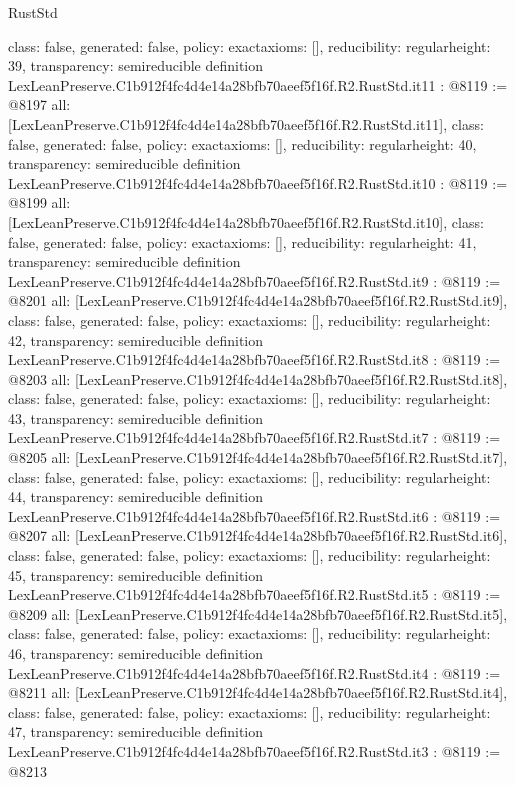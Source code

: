 \begin{lexlean}{RustStd}
\begin{coremodule}
{  class: false,
  generated: false,
  policy: exact{axioms: []},
  reducibility: regular{height: 39},
  transparency: semireducible
}
definition LexLeanPreserve.C1b912f4fc4d4e14a28bfb70aeef5f16f.R2.RustStd.it11 : @8119 := @8197 {
  all: [LexLeanPreserve.C1b912f4fc4d4e14a28bfb70aeef5f16f.R2.RustStd.it11],
  class: false,
  generated: false,
  policy: exact{axioms: []},
  reducibility: regular{height: 40},
  transparency: semireducible
}
definition LexLeanPreserve.C1b912f4fc4d4e14a28bfb70aeef5f16f.R2.RustStd.it10 : @8119 := @8199 {
  all: [LexLeanPreserve.C1b912f4fc4d4e14a28bfb70aeef5f16f.R2.RustStd.it10],
  class: false,
  generated: false,
  policy: exact{axioms: []},
  reducibility: regular{height: 41},
  transparency: semireducible
}
definition LexLeanPreserve.C1b912f4fc4d4e14a28bfb70aeef5f16f.R2.RustStd.it9 : @8119 := @8201 {
  all: [LexLeanPreserve.C1b912f4fc4d4e14a28bfb70aeef5f16f.R2.RustStd.it9],
  class: false,
  generated: false,
  policy: exact{axioms: []},
  reducibility: regular{height: 42},
  transparency: semireducible
}
definition LexLeanPreserve.C1b912f4fc4d4e14a28bfb70aeef5f16f.R2.RustStd.it8 : @8119 := @8203 {
  all: [LexLeanPreserve.C1b912f4fc4d4e14a28bfb70aeef5f16f.R2.RustStd.it8],
  class: false,
  generated: false,
  policy: exact{axioms: []},
  reducibility: regular{height: 43},
  transparency: semireducible
}
definition LexLeanPreserve.C1b912f4fc4d4e14a28bfb70aeef5f16f.R2.RustStd.it7 : @8119 := @8205 {
  all: [LexLeanPreserve.C1b912f4fc4d4e14a28bfb70aeef5f16f.R2.RustStd.it7],
  class: false,
  generated: false,
  policy: exact{axioms: []},
  reducibility: regular{height: 44},
  transparency: semireducible
}
definition LexLeanPreserve.C1b912f4fc4d4e14a28bfb70aeef5f16f.R2.RustStd.it6 : @8119 := @8207 {
  all: [LexLeanPreserve.C1b912f4fc4d4e14a28bfb70aeef5f16f.R2.RustStd.it6],
  class: false,
  generated: false,
  policy: exact{axioms: []},
  reducibility: regular{height: 45},
  transparency: semireducible
}
definition LexLeanPreserve.C1b912f4fc4d4e14a28bfb70aeef5f16f.R2.RustStd.it5 : @8119 := @8209 {
  all: [LexLeanPreserve.C1b912f4fc4d4e14a28bfb70aeef5f16f.R2.RustStd.it5],
  class: false,
  generated: false,
  policy: exact{axioms: []},
  reducibility: regular{height: 46},
  transparency: semireducible
}
definition LexLeanPreserve.C1b912f4fc4d4e14a28bfb70aeef5f16f.R2.RustStd.it4 : @8119 := @8211 {
  all: [LexLeanPreserve.C1b912f4fc4d4e14a28bfb70aeef5f16f.R2.RustStd.it4],
  class: false,
  generated: false,
  policy: exact{axioms: []},
  reducibility: regular{height: 47},
  transparency: semireducible
}
definition LexLeanPreserve.C1b912f4fc4d4e14a28bfb70aeef5f16f.R2.RustStd.it3 : @8119 := @8213 {
}
\end{coremodule}
\end{lexlean}
